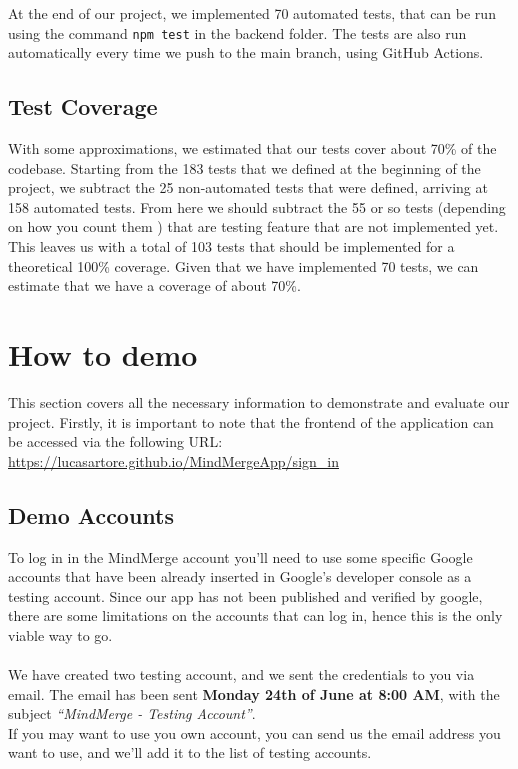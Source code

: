\documentclass{article}
\begin{document}
At the end of our project, we implemented 70 automated tests, that can be run using the command \texttt{npm test}
in the backend folder.
\newline
The tests are also run automatically every time we push to the main branch, using GitHub Actions.

\subsection{Test Coverage}

With some approximations, we estimated that our tests cover about 70\% of the codebase.
\newline
Starting from the 183 tests that we defined at the beginning of the project, we subtract the 25 non-automated
tests that were defined, arriving at 158 automated tests.
\newline
From here we should subtract the 55 or so tests (depending on how you count them ) that
are testing feature that are not implemented yet. This leaves us with a total of 103 tests that should be implemented 
for a theoretical 100\% coverage.
\newline
Given that we have implemented 70 tests, we can estimate that we have a coverage of about 70\%.

\section{How to demo}
This section covers all the necessary information to demonstrate and evaluate our project. Firstly, it is important to note that the frontend of the application can be accessed via the following URL: \url{https://lucasartore.github.io/MindMergeApp/sign_in}
\subsection{Demo Accounts}

To log in in the MindMerge account you'll need to use some specific Google accounts that have been already inserted in Google's developer console as a testing account.
Since our app has not been published and verified by google, there are some limitations on the accounts that can log in, hence this is the only viable way to go.\\\\
We have created two testing account, and we sent the credentials to you via email.
The email has been sent \textbf{Monday 24th of June at 8:00 AM}, with the subject \textit{``MindMerge - Testing Account''}.\\
If you may want to use you own account, you can send us the email address you want to use, and we'll add it to the list of testing accounts.
\end{document}
